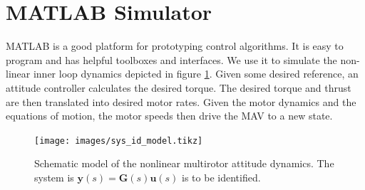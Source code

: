 \section{MATLAB Simulator}
\label{sec:matlab_simulator}
MATLAB is a good platform for prototyping control algorithms. It is easy to program and has helpful toolboxes and interfaces. We use it to simulate the non-linear inner loop dynamics depicted in figure \ref{pics:sys_id_model}. Given some desired reference, an attitude controller calculates the desired torque. The desired torque and thrust are then translated into desired motor rates. Given the motor dynamics and the equations of motion, the motor speeds then drive the MAV to a new state.
\begin{figure}
\centering
\texttt{[image: images/sys\_id\_model.tikz]}
\caption{Schematic model of the nonlinear multirotor attitude dynamics. The system is $\mathbf{y}(s) = \mathbf{G}(s) \mathbf{u}(s)$ is to be identified.}
\label{pics:sys_id_model}
\end{figure}


